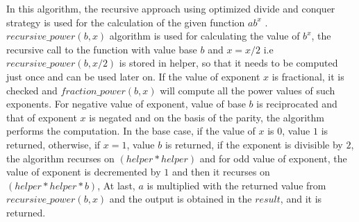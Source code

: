\documentclass[12pt, a4paper]{article}
\begin{document}
\noindent
In this algorithm, the recursive approach using optimized divide and conquer strategy is used for the calculation of the given function $ab^x$ \cite{Recursive Power Function}. $recursive\_power(b,x)$ algorithm is used for calculating the value of $b^x$, the recursive call to the function with value base $b$ and $x = x/2$ i.e $recursive\_power(b,x/2)$ is stored in helper, so that it needs to be computed just once and can be used later on. If the value of exponent $x$ is fractional, it is checked and $fraction\_power(b,x)$ will compute all the power values of such exponents. For negative value of exponent, value of base $b$ is reciprocated and that of exponent $x$ is negated and on the basis of the parity, the algorithm performs the computation. In the base case, if the value of $x$ is 0, value $1$ is returned, otherwise, if $x=1$, value $b$ is returned, if the exponent is divisible by $2$, the algorithm recurses on $(helper * helper)$ and for odd value of exponent, the value of exponent is decremented by $1$ and then it recurses on $(helper * helper * b)$,  At last, $a$ is multiplied with the returned value from $recursive\_power(b,x)$ and the output is obtained in the $result$, and it is returned.
\end{document}
